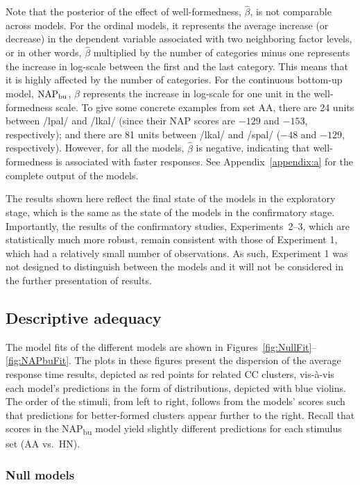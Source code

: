 Note that the posterior of the effect of well-formedness, \(\hat\beta\), is not comparable across models. For the ordinal models, it represents the average increase (or decrease) in the dependent variable associated with two neighboring factor levels, or in other words, \(\hat\beta\) multiplied by the number of categories minus one represents the increase in log-scale between the first and the last category. This means that
it
is highly affected by the number of categories. For the continuous bottom-up model, \(\operatorname{NAP}_{\text{bu}}\),
\(\beta\)
represents the increase in log-scale for one unit in the well-formedness scale. To give some concrete examples from set AA, there are 24 units between /lpal/ and /lkal/ (since their NAP scores are $-129$ and $-153$, respectively); and there are 81 units between /lkal/ and /spal/ ($-48$ and $-129$, respectively). However, for all the models, \(\hat\beta\) is negative, indicating that well-formedness is associated with faster responses. See Appendix~\ref{appendix:a} for the complete output of the models.

The results shown here reflect the final state of the models in the exploratory stage, which is the same as the state of the models in the confirmatory stage. Importantly, the results of the confirmatory studies, Experiments~2–3, which are statistically much more robust, remain consistent with those of Experiment 1, which had a relatively small number of observations. As such, Experiment 1 was not designed to distinguish between the models and it will not be considered in the further presentation of results.

\subsection{Descriptive adequacy}\label{descriptive-adequacy}

The model fits of the different models are shown in Figures~\ref{fig:NullFit}--\ref{fig:NAPbuFit}. The plots in these figures present the dispersion of the average response time results, depicted as red points for related CC clusters, vis-à-vis each model's predictions in the form of distributions, depicted with blue violins. The order of the stimuli, from left to right, follows from the models' scores such that predictions for better-formed clusters appear further to the right. Recall that scores in the NAP\textsubscript{bu} model yield slightly different predictions for each stimulus set (AA vs.~HN).

\subsubsection{Null models}\label{null-models}

